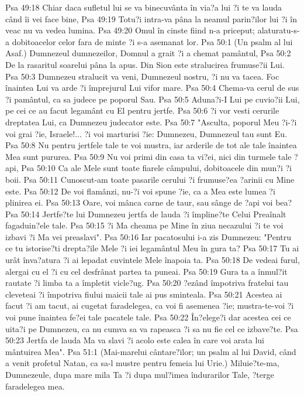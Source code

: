 Psa 49:18  Chiar daca sufletul lui se va binecuvânta în via?a lui ?i te va lauda când îi vei face bine,
Psa 49:19  Totu?i intra-va pâna la neamul parin?ilor lui ?i în veac nu va vedea lumina.
Psa 49:20  Omul în cinste fiind n-a priceput; alaturatu-s-a dobitoacelor celor fara de minte ?i s-a asemanat lor.
Psa 50:1  (Un psalm al lui Asaf.) Dumnezeul dumnezeilor, Domnul a grait ?i a chemat pamântul,
Psa 50:2  De la rasaritul soarelui pâna la apus. Din Sion este stralucirea frumuse?ii Lui.
Psa 50:3  Dumnezeu stralucit va veni, Dumnezeul nostru, ?i nu va tacea. Foc înaintea Lui va arde ?i împrejurul Lui vifor mare.
Psa 50:4  Chema-va cerul de sus ?i pamântul, ca sa judece pe poporul Sau.
Psa 50:5  Aduna?i-I Lui pe cuvio?ii Lui, pe cei ce au facut legamânt cu El pentru jertfe.
Psa 50:6  ?i vor vesti cerurile dreptatea Lui, ca Dumnezeu judecator este.
Psa 50:7  "Asculta, poporul Meu ?i-?i voi grai ?ie, Israele!... ?i voi marturisi ?ie: Dumnezeu, Dumnezeul tau sunt Eu.
Psa 50:8  Nu pentru jertfele tale te voi mustra, iar arderile de tot ale tale înaintea Mea sunt pururea.
Psa 50:9  Nu voi primi din casa ta vi?ei, nici din turmele tale ?api,
Psa 50:10  Ca ale Mele sunt toate fiarele câmpului, dobitoacele din mun?i ?i boii.
Psa 50:11  Cunoscut-am toate pasarile cerului ?i frumuse?ea ?arinii cu Mine este.
Psa 50:12  De voi flamânzi, nu-?i voi spune ?ie, ca a Mea este lumea ?i plinirea ei.
Psa 50:13  Oare, voi mânca carne de taur, sau sânge de ?api voi bea?
Psa 50:14  Jertfe?te lui Dumnezeu jertfa de lauda ?i împline?te Celui Preaînalt fagaduin?ele tale.
Psa 50:15  ?i Ma cheama pe Mine în ziua necazului ?i te voi izbavi ?i Ma vei preaslavi".
Psa 50:16  Iar pacatosului i-a zis Dumnezeu: "Pentru ce tu istorise?ti drepta?ile Mele ?i iei legamântul Meu în gura ta?
Psa 50:17  Tu ai urât înva?atura ?i ai lepadat cuvintele Mele înapoia ta.
Psa 50:18  De vedeai furul, alergai cu el ?i cu cel desfrânat partea ta puneai.
Psa 50:19  Gura ta a înmul?it rautate ?i limba ta a împletit vicle?ug.
Psa 50:20  ?ezând împotriva fratelui tau cleveteai ?i împotriva fiului maicii tale ai pus sminteala.
Psa 50:21  Acestea ai facut ?i am tacut, ai cugetat faradelegea, ca voi fi asemenea ?ie; mustra-te-voi ?i voi pune înaintea fe?ei tale pacatele tale.
Psa 50:22  În?elege?i dar acestea cei ce uita?i pe Dumnezeu, ca nu cumva sa va rapeasca ?i sa nu fie cel ce izbave?te.
Psa 50:23  Jertfa de lauda Ma va slavi ?i acolo este calea în care voi arata lui mântuirea Mea".
Psa 51:1  (Mai-marelui cântare?ilor; un psalm al lui David, când a venit profetul Natan, ca sa-l mustre pentru femeia lui Urie.) Miluie?te-ma, Dumnezeule, dupa mare mila Ta ?i dupa mul?imea îndurarilor Tale, ?terge faradelegea mea.
